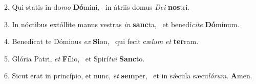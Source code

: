 2. Qui statis in do\textit{mo} \textbf{Dó}mini, \ast\  in átriis domus \textit{De}\textit{i} \textbf{nos}tri.\

3. In nóctibus extóllite manus vestras \textit{in} \textbf{sanc}ta, \ast\  et benedí\textit{ci}\textit{te} \textbf{Dó}minum.\

4. Benedícat te Dóminus \textit{ex} \textbf{Si}on, \ast\  qui fecit cæ\textit{lum} \textit{et} \textbf{ter}ram.\

5. Glória Patri, \textit{et} \textbf{Fí}lio, \ast\  et Spirí\textit{tu}\textit{i} \textbf{Sanc}to.\

6. Sicut erat in princípio, et nunc, \textit{et} \textbf{sem}per, \ast\  et in sǽcula sæcu\textit{ló}\textit{rum}. \textbf{A}men.\

